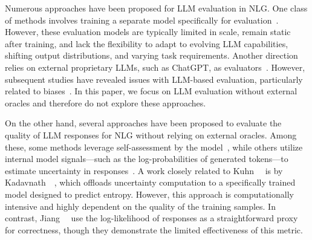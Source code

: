 Numerous approaches have been proposed for LLM evaluation in NLG. One class of methods involves training a separate model specifically for evaluation~\cite{DBLP:journals/corr/abs-2306-05087,DBLP:journals/corr/abs-2308-04592}. However, these evaluation models are typically limited in scale, remain static after training, and lack the flexibility to adapt to evolving LLM capabilities, shifting output distributions, and varying task requirements. Another direction relies on external proprietary LLMs, such as ChatGPT, as evaluators~\cite{DBLP:journals/corr/abs-2303-04048,DBLP:conf/eamt/KocmiF23}. However, subsequent studies have revealed issues with LLM-based evaluation, particularly related to biases~\cite{DBLP:conf/acl/WangLCCZLCKLLS24}.
In this paper, we focus on LLM evaluation without external oracles and therefore do not explore these approaches.

On the other hand, several approaches have been proposed to evaluate the quality of LLM responses for NLG without relying on external oracles. Among these, some methods leverage self-assessment by the model~\cite{DBLP:conf/icml/0001TDM24,DBLP:conf/acl/Xia0WCZ24,DBLP:journals/tmlr/LinHE22,DBLP:journals/corr/abs-2207-05221}, while others utilize internal model signals---such as the log-probabilities of generated tokens---to estimate uncertainty in responses~\cite{abbasi2024believe,farquhar2024detecting,kuhnsemantic,DBLP:conf/iclr/MalininG21}. A work closely related to Kuhn~\etal~\cite{kuhnsemantic} is by Kadavnath~\etal~\cite{DBLP:journals/corr/abs-2207-05221}, which offloads uncertainty computation to a specifically trained model designed to predict entropy. However, this approach is computationally intensive and highly dependent on the quality of the training samples.
In contrast, Jiang~\etal~\cite{jiang2021can} use the log-likelihood of responses as a straightforward proxy for correctness, though they demonstrate the limited effectiveness of this metric.



